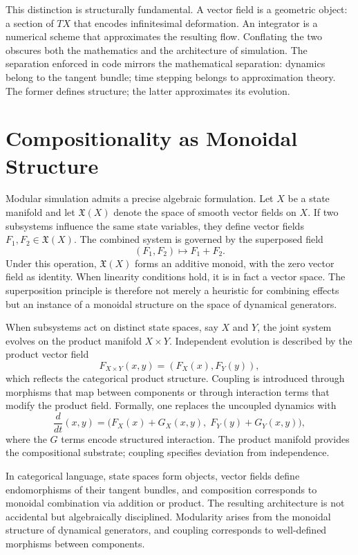 \documentclass[12pt]{book}
\begin{document}
This distinction is structurally fundamental. A vector field is a geometric object: a section of $TX$ that encodes infinitesimal deformation. An integrator is a numerical scheme that approximates the resulting flow. Conflating the two obscures both the mathematics and the architecture of simulation. The separation enforced in code mirrors the mathematical separation: dynamics belong to the tangent bundle; time stepping belongs to approximation theory. The former defines structure; the latter approximates its evolution.

\section{Compositionality as Monoidal Structure}

Modular simulation admits a precise algebraic formulation. Let $X$ be a
state manifold and let $\mathfrak{X}(X)$ denote the space of smooth vector
fields on $X$. If two subsystems influence the same state variables, they
define vector fields $F_1, F_2 \in \mathfrak{X}(X)$. The combined system is
governed by the superposed field
\[
(F_1, F_2) \longmapsto F_1 + F_2.
\]
Under this operation, $\mathfrak{X}(X)$ forms an additive monoid, with the
zero vector field as identity. When linearity conditions hold, it is in fact
a vector space. The superposition principle is therefore not merely a
heuristic for combining effects but an instance of a monoidal structure on
the space of dynamical generators.

When subsystems act on distinct state spaces, say $X$ and $Y$, the joint
system evolves on the product manifold $X \times Y$. Independent evolution
is described by the product vector field
\[
F_{X \times Y}(x,y) = (F_X(x), F_Y(y)),
\]
which reflects the categorical product structure. Coupling is introduced
through morphisms that map between components or through interaction terms
that modify the product field. Formally, one replaces the uncoupled dynamics
with
\[
\frac{d}{dt}(x,y)
=
\big(F_X(x) + G_X(x,y),\; F_Y(y) + G_Y(x,y)\big),
\]
where the $G$ terms encode structured interaction. The product manifold
provides the compositional substrate; coupling specifies deviation from
independence.

In categorical language, state spaces form objects, vector fields define
endomorphisms of their tangent bundles, and composition corresponds to
monoidal combination via addition or product. The resulting architecture is
not accidental but algebraically disciplined. Modularity arises from the
monoidal structure of dynamical generators, and coupling corresponds to
well-defined morphisms between components.
\end{document}
